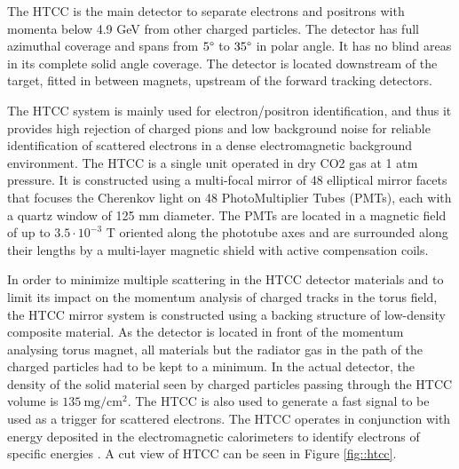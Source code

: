     The HTCC is the main detector to separate electrons and positrons with momenta below 4.9 GeV from other charged particles.
    The detector has full azimuthal coverage and spans from $5\degree$ to $35\degree$ in polar angle.
    It has no blind areas in its complete solid angle coverage.
    The detector is located downstream of the target, fitted in between magnets, upstream of the forward tracking detectors.

    The HTCC system is mainly used for electron/positron identification, and thus it provides high rejection of charged pions and low background noise for reliable identification of scattered electrons in a dense electromagnetic background environment.
    The HTCC is a single unit operated in dry CO2 gas at 1 atm pressure.
    It is constructed using a multi-focal mirror of 48 elliptical mirror facets that focuses the Cherenkov light on 48 PhotoMultiplier Tubes (PMTs), each with a quartz window of 125 mm diameter.
    The PMTs are located in a magnetic field of up to $3.5\cdot 10^{-3}$ T oriented along the phototube axes and are surrounded along their lengths by a multi-layer magnetic shield with active compensation coils.

    In order to minimize multiple scattering in the HTCC detector materials and to limit its impact on the momentum analysis of charged tracks in the torus field, the HTCC mirror system is constructed using a backing structure of low-density composite material.
    As the detector is located in front of the momentum analysing torus magnet, all materials but the radiator gas in the path of the charged particles had to be kept to a minimum.
    In the actual detector, the density of the solid material seen by charged particles passing through the HTCC volume is $135 ~\text{mg}/\text{cm}^2$.
    The HTCC is also used to generate a fast signal to be used as a trigger for scattered electrons.
    The HTCC operates in conjunction with energy deposited in the electromagnetic calorimeters to identify electrons of specific energies \cite{sharabian2020}.
    A cut view of HTCC can be seen in Figure \ref{fig::htcc}.

